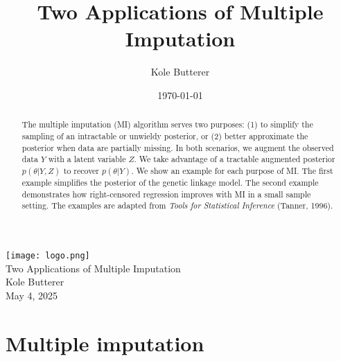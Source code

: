 \documentclass{article}
\title{Two Applications of Multiple Imputation}
\author{Kole Butterer}
\date{\today}
\begin{document}
\begin{center}
    \vspace*{-1cm} %
    \texttt{[image: logo.png]} \\[.1cm] %
    \vspace*{1cm} %
    {\LARGE Two Applications of Multiple Imputation} \\[0.5cm]
    {\large Kole Butterer} \\[0.5cm]
    {\large May 4, 2025}
\end{center}
\begin{abstract}
  The multiple imputation (MI) algorithm serves two purposes: (1) to simplify the sampling of an intractable or unwieldy posterior, 
  or (2) better approximate the posterior when data are partially missing. 
  In both scenarios, we augment the observed data $Y$ with a latent variable $Z$. 
  We take advantage of a tractable augmented posterior $p(\theta | Y, Z)$ to recover $p(\theta | Y)$. 
  We show an example for each purpose of MI. The first example simplifies the posterior
  of the genetic linkage model. The second example demonstrates how right-censored regression improves
  with MI in a small sample setting. 
  The examples are adapted from \textit{Tools for Statistical Inference} (Tanner, 1996). 
\end{abstract}
\pagebreak
\section{Multiple imputation}
\end{document}
